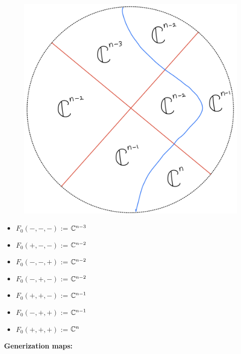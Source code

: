 \begin{figure}[H]
    \centering
    \includegraphics[scale = 0.45]{diagrams/cobord'4/20.png}
    \caption{}
    \label{fig:your-label}
\end{figure}
\begin{itemize}
\item $F_0(-,-,-)$ := $\mathbb{C}^{n-3}$
\item $F_0(+,-,-)$ := $\mathbb{C}^{n-2}$
\item $F_0(-,-,+)$ := $\mathbb{C}^{n-2}$
\item $F_0(-,+,-)$ := $\mathbb{C}^{n-2}$
\item $F_0(+,+,-)$ := $\mathbb{C}^{n-1}$
\item $F_0(-,+,+)$ := $\mathbb{C}^{n-1}$
\item $F_0(+,+,+)$ := $\mathbb{C}^n$
\end{itemize}
\textbf{Generization maps:}
